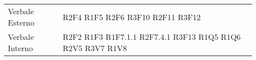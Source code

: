 \begin{center}
\begin{longtable}{C{6cm} C{6cm}}
Verbale Esterno & R2F4 \newline
					R1F5 \newline
					R2F6 \newline
					R3F10 \newline
					R2F11 \newline
					R3F12 \\

Verbale Interno & 	R2F2 \newline
					R1F3 \newline
					R1F7.1.1 \newline
					R2F7.4.1 \newline
					R3F13 \newline
					R1Q5 \newline
					R1Q6 \newline
					R2V5 \newline
					R3V7 \newline
					R1V8 \\

\end{longtable}
\end{center}
